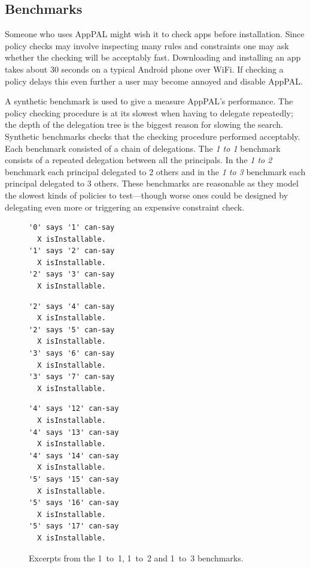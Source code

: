 \documentclass[thesis.tex]{subfiles}
\begin{document}
\subsection{Benchmarks}
\label{ssec:benchmarks}

Someone who uses AppPAL might wish it to check apps before installation. Since
policy checks may involve inspecting many rules and constraints one may ask
whether the checking will be acceptably fast. Downloading and installing an app
takes about 30 seconds on a typical Android phone over WiFi. If checking a
policy delays this even further a user may become annoyed and disable AppPAL.

A synthetic benchmark is used to give a measure AppPAL's performance. The policy
checking procedure is at its slowest when having to delegate repeatedly; the
depth of the delegation tree is the biggest reason for slowing the search.
Synthetic benchmarks checks that the checking procedure performed acceptably.
Each benchmark consisted of a chain of delegations. The \emph{1 to 1} benchmark
consists of a repeated delegation between all the principals. In the \emph{1 to
2} benchmark each principal delegated to 2 others and in the \emph{1 to 3}
benchmark each principal delegated to 3 others. These benchmarks are reasonable
as they model the slowest kinds of policies to test---though worse ones could be
designed by delegating even more or triggering an expensive constraint check.

\noindent
\begin{figure}\centering\footnotesize\sffamily
\begin{minipage}[t]{.32\textwidth}
\begin{lstlisting}[basicstyle=\ttfamily\footnotesize]
'0' says '1' can-say
  X isInstallable.
'1' says '2' can-say
  X isInstallable.
'2' says '3' can-say
  X isInstallable.
\end{lstlisting}
\end{minipage}\hfill
\begin{minipage}[t]{.32\textwidth}
\begin{lstlisting}[basicstyle=\ttfamily\footnotesize]
'2' says '4' can-say
  X isInstallable.
'2' says '5' can-say
  X isInstallable.
'3' says '6' can-say
  X isInstallable.
'3' says '7' can-say
  X isInstallable.
\end{lstlisting}
\end{minipage}\hfill
\begin{minipage}[t]{.32\textwidth}
\begin{lstlisting}[basicstyle=\ttfamily\footnotesize]
'4' says '12' can-say
  X isInstallable.
'4' says '13' can-say
  X isInstallable.
'4' says '14' can-say
  X isInstallable.
'5' says '15' can-say
  X isInstallable.
'5' says '16' can-say
  X isInstallable.
'5' says '17' can-say
  X isInstallable.
\end{lstlisting}
\end{minipage}
\caption{Excerpts from the 1~to~1, 1~to~2 and 1~to~3 benchmarks.}
\label{fig:benchmark-excerpts}
\end{figure}
\end{document}
